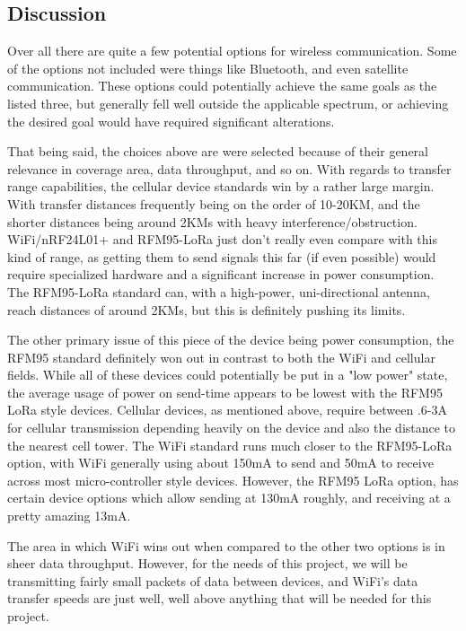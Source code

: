 \documentclass[onecolumn, draftclsnofoot,10pt, compsoc]{IEEEtran}
\begin{document}
    \subsection{Discussion}
    Over all there are quite a few potential options for wireless communication.
    Some of the options not included were things like Bluetooth, and even satellite communication.
    These options could potentially achieve the same goals as the listed three, but generally fell well outside the applicable spectrum, or achieving the desired goal would have required significant alterations.\par
    That being said, the choices above are were selected because of their general relevance in coverage area, data throughput, and so on.
    With regards to transfer range capabilities, the cellular device standards win by a rather large margin.
    With transfer distances frequently being on the order of 10-20KM, and the shorter distances being around 2KMs with heavy interference/obstruction.
    WiFi/nRF24L01+ and RFM95-LoRa just don't really even compare with this kind of range, as getting them to send signals this far (if even possible) would require specialized hardware and a significant increase in power consumption.
    The RFM95-LoRa standard can, with a high-power, uni-directional antenna, reach distances of around 2KMs, but this is definitely pushing its limits.\par
    The other primary issue of this piece of the device being power consumption, the RFM95 standard definitely won out in contrast to both the WiFi and cellular fields.
    While all of these devices could potentially be put in a "low power" state, the average usage of power on send-time appears to be lowest with the RFM95 LoRa style devices.
    Cellular devices, as mentioned above, require between .6-3A for cellular transmission depending heavily on the device and also the distance to the nearest cell tower.
    The WiFi standard runs much closer to the RFM95-LoRa option, with WiFi generally using about 150mA to send and 50mA to receive across most micro-controller style devices.
    However, the RFM95 LoRa option, has certain device options which allow sending at 130mA roughly, and receiving at a pretty amazing 13mA.\par
    The area in which WiFi wins out when compared to the other two options is in sheer data throughput.
    However, for the needs of this project, we will be transmitting fairly small packets of data between devices, and WiFi's data transfer speeds are just well, well above anything that will be needed for this project.
    
\end{document}
